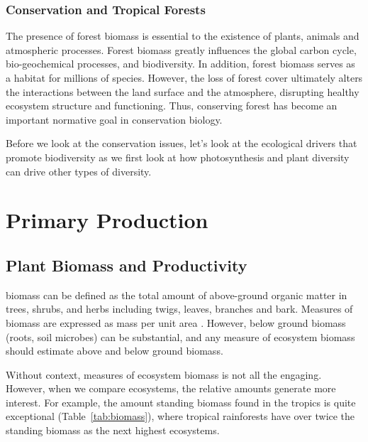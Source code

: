 \subsubsection{Conservation and Tropical Forests}

The presence of forest biomass is essential to the existence of plants, animals and atmospheric processes. Forest biomass greatly influences the global carbon cycle, bio-geochemical processes, and biodiversity.  In addition, forest biomass serves as a habitat for millions of species. However, the loss of forest cover ultimately alters the interactions between the land surface and the atmosphere, disrupting healthy ecosystem structure and functioning. Thus, conserving forest has become an important normative goal in conservation biology.

Before we look at the conservation issues, let's look at the ecological drivers that promote biodiversity as we first look at how photosynthesis and plant diversity can drive other types of diversity. 

\section{Primary Production}

\subsection{Plant Biomass and Productivity}

	
\Gls{biomass} can be defined as the total amount of above-ground organic matter in trees, shrubs, and herbs including twigs, leaves, branches and bark. Measures of biomass are expressed as mass per unit area \citep{brown1991biomass}. However, below ground biomass (roots, soil microbes) can be substantial, and any measure of ecosystem biomass should estimate above and below ground biomass. 

Without context, measures of ecosystem biomass is not all the engaging. However, when we compare ecosystems, the relative amounts generate more interest. For example, the amount standing biomass found in the tropics is quite exceptional (Table~\ref{tab:biomass}), where tropical rainforests have over twice the standing biomass as the next highest ecosystems. 

